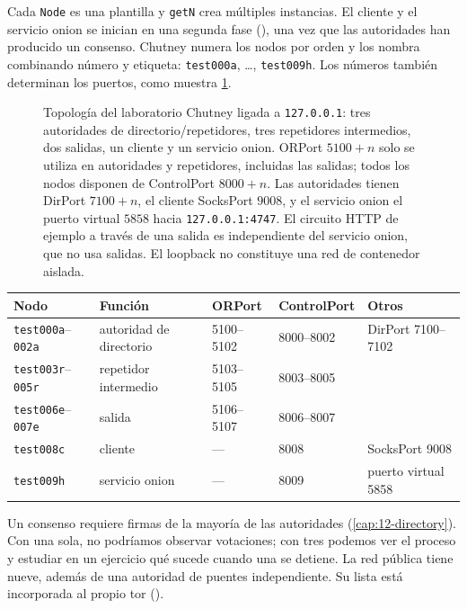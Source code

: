 Cada \texttt{Node} es una plantilla y \texttt{getN} crea múltiples instancias. El cliente y el servicio onion se inician en una segunda fase (), una vez que las autoridades han producido un consenso. Chutney numera los nodos por orden y los nombra combinando número y etiqueta: \texttt{test000a}, \ldots, \texttt{test009h}. Los números también determinan los puertos, como muestra \cref{fig:rete-privata}.

\begin{figure}[htbp]
\centering

\caption{Topología del laboratorio Chutney ligada a \texttt{127.0.0.1}: tres autoridades de directorio/repetidores, tres repetidores intermedios, dos salidas, un cliente y un servicio onion. ORPort $5100+n$ solo se utiliza en autoridades y repetidores, incluidas las salidas; todos los nodos disponen de ControlPort $8000+n$. Las autoridades tienen DirPort $7100+n$, el cliente SocksPort $9008$, y el servicio onion el puerto virtual $5858$ hacia \texttt{127.0.0.1:4747}. El circuito HTTP de ejemplo a través de una salida es independiente del servicio onion, que no usa salidas. El loopback no constituye una red de contenedor aislada.}
\label{fig:rete-privata}
\end{figure}

\begin{center}\small
\begin{tabular}{lllll}
\toprule
Nodo & Función & ORPort & ControlPort & Otros \\
\midrule
\texttt{test000a}--\texttt{002a} & autoridad de directorio & 5100--5102 & 8000--8002 & DirPort 7100--7102 \\
\texttt{test003r}--\texttt{005r} & repetidor intermedio & 5103--5105 & 8003--8005 & \\
\texttt{test006e}--\texttt{007e} & salida & 5106--5107 & 8006--8007 & \\
\texttt{test008c} & cliente & --- & 8008 & SocksPort 9008 \\
\texttt{test009h} & servicio onion & --- & 8009 & puerto virtual 5858 \\
\bottomrule
\end{tabular}
\end{center}

\begin{approfondimento}
Un consenso requiere firmas de la mayoría de las autoridades (\cref{cap:12-directory}). Con una sola, no podríamos observar votaciones; con tres podemos ver el proceso y estudiar en un ejercicio qué sucede cuando una se detiene. La red pública tiene nueve, además de una autoridad de puentes independiente. Su lista está incorporada al propio tor ().
\end{approfondimento}

